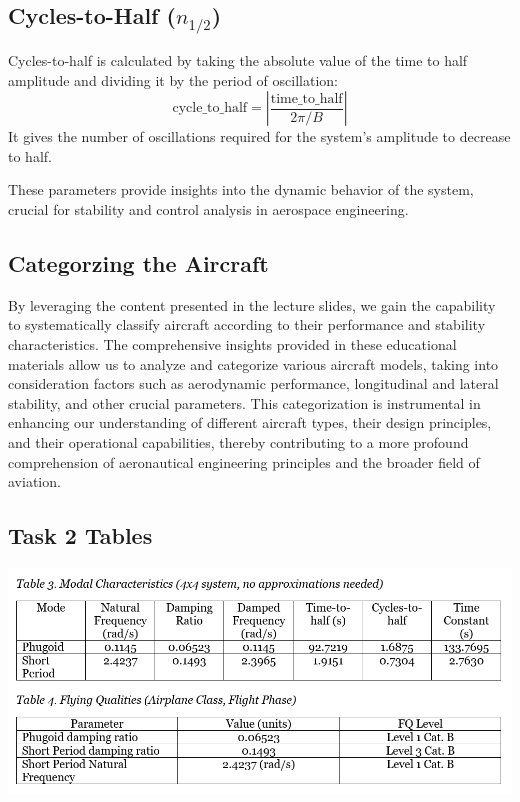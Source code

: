 \documentclass[a4paper, twoside]{article}
\begin{document}
\subsection*{Cycles-to-Half (\(n_{1/2}\))}

Cycles-to-half is calculated by taking the absolute value of the time to half amplitude and dividing it by the period of oscillation:
\[ \text{cycle\_to\_half} = \left|\frac{\text{time\_to\_half}}{2\pi / B}\right| \]
It gives the number of oscillations required for the system's amplitude to decrease to half.

These parameters provide insights into the dynamic behavior of the system, crucial for stability and control analysis in aerospace engineering.
\subsection{Categorzing the Aircraft}
By leveraging the content presented in the lecture slides, we gain the capability to systematically classify aircraft according 
to their performance and stability characteristics. 
The comprehensive insights provided in these educational materials allow us to analyze and categorize various aircraft models,
 taking into consideration factors such as aerodynamic performance, longitudinal and lateral stability, and other crucial parameters.
  This categorization is instrumental in enhancing our understanding of different aircraft types, 
  their design principles, and their operational capabilities, thereby contributing to a more profound comprehension of 
  aeronautical engineering principles and the broader field of aviation.


\subsection{Task 2 Tables}
\begin{center}
\includegraphics[width=\linewidth]{table-2-1.png}
\end{center}
\pagebreak


\end{document}
